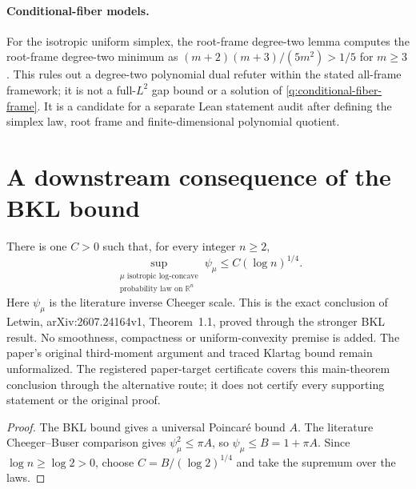 \paragraph{Conditional-fiber models.}
For the isotropic uniform simplex, the root-frame degree-two lemma computes the
root-frame degree-two minimum as $(m+2)(m+3)/(5m^2)>1/5$ for $m\ge3$.
This rules out a degree-two polynomial dual refuter within the stated all-frame framework;
it is not a full-$L^2$ gap bound or a solution of \cref{q:conditional-fiber-frame}.
It is a candidate for a separate Lean statement audit after defining the simplex law,
root frame and finite-dimensional polynomial quotient.

\section{A downstream consequence of the BKL bound}

\begin{theorem}
  \label{thm:letwin-log-quarter}
  \leanok
  There is one $C>0$ such that, for every integer $n\ge2$,
  \[
    \sup_{\substack{\mu\text{ isotropic log-concave}\\
                     \text{probability law on }\mathbb R^n}}
         \psi_\mu \le C(\log n)^{1/4}.
  \]
  Here $\psi_\mu$ is the literature inverse Cheeger scale. This is the exact conclusion
  of Letwin, arXiv:2607.24164v1, Theorem~1.1, proved through the stronger BKL result.
  No smoothness, compactness or uniform-convexity premise is added. The paper's original
  third-moment argument and traced Klartag bound remain unformalized. The registered
  paper-target certificate covers this main-theorem conclusion through the alternative route;
  it does not certify every supporting statement or the original proof.
\end{theorem}
\begin{proof}
  \leanok
  The BKL bound gives a universal Poincar\'e bound $A$. The literature
  Cheeger--Buser comparison gives $\psi_\mu^2\le\pi A$, so
  $\psi_\mu\le B=1+\pi A$. Since $\log n\ge\log2>0$,
  choose $C=B/(\log2)^{1/4}$ and take the supremum over the laws.
\end{proof}
